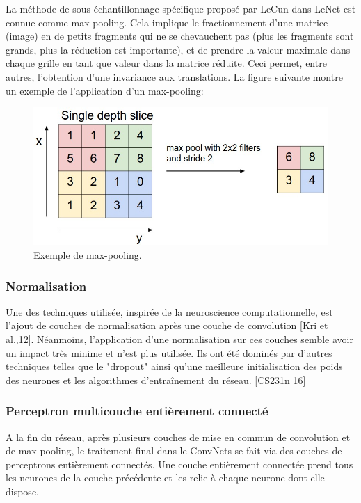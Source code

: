 	La méthode de sous-échantillonnage spécifique proposé par LeCun dans LeNet est connue comme max-pooling. Cela implique le fractionnement d'une matrice (image) en de petits fragments qui ne se chevauchent pas (plus les fragments sont grands, plus la réduction est importante), et de prendre la valeur maximale dans chaque grille en tant que valeur dans la matrice réduite. 
	Ceci permet, entre autres, l'obtention d'une invariance aux translations. La figure suivante montre un exemple de l'application d'un max-pooling:

\begin{figure}[H]
	\centering
		\includegraphics[width=5in]{Figures/maxpool.jpeg}
	\caption[MP]{Exemple de max-pooling.}
	\label{fig:Electron}
\end{figure}


\subsubsection{Normalisation}

	Une des techniques utilisée, inspirée de la neuroscience computationnelle, est l'ajout de couches de normalisation après une couche de convolution [Kri et al.,12]. Néanmoins, l'application d'une normalisation sur ces couches semble avoir un impact très minime et n'est plus utilisée. Ils ont été dominés par d'autres techniques telles que le "dropout" ainsi qu'une meilleure initialisation des poids des neurones et les algorithmes d'entraînement du réseau. [CS231n 16]
	
\subsubsection{Perceptron multicouche entièrement connecté}

	A la fin du réseau, après plusieurs couches de mise en commun de convolution et de max-pooling, le traitement final dans le ConvNets se fait via des couches de perceptrons entièrement connectés. Une couche entièrement connectée prend tous les neurones de la couche précédente et les relie à chaque neurone dont elle dispose.

